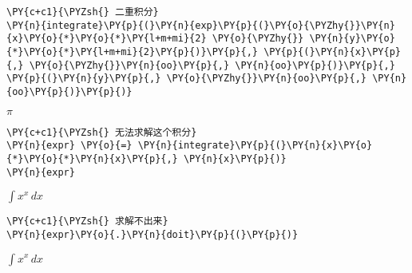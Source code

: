     \begin{tcolorbox}[breakable, size=fbox, boxrule=1pt, pad at break*=1mm,colback=cellbackground, colframe=cellborder]
\begin{Verbatim}[commandchars=\\\{\}]
\PY{c+c1}{\PYZsh{} 二重积分}
\PY{n}{integrate}\PY{p}{(}\PY{n}{exp}\PY{p}{(}\PY{o}{\PYZhy{}}\PY{n}{x}\PY{o}{*}\PY{o}{*}\PY{l+m+mi}{2} \PY{o}{\PYZhy{}} \PY{n}{y}\PY{o}{*}\PY{o}{*}\PY{l+m+mi}{2}\PY{p}{)}\PY{p}{,} \PY{p}{(}\PY{n}{x}\PY{p}{,} \PY{o}{\PYZhy{}}\PY{n}{oo}\PY{p}{,} \PY{n}{oo}\PY{p}{)}\PY{p}{,} \PY{p}{(}\PY{n}{y}\PY{p}{,} \PY{o}{\PYZhy{}}\PY{n}{oo}\PY{p}{,} \PY{n}{oo}\PY{p}{)}\PY{p}{)}
\end{Verbatim}
\end{tcolorbox}
 
            
    
    $\displaystyle \pi$

    

    \begin{tcolorbox}[breakable, size=fbox, boxrule=1pt, pad at break*=1mm,colback=cellbackground, colframe=cellborder]
\begin{Verbatim}[commandchars=\\\{\}]
\PY{c+c1}{\PYZsh{} 无法求解这个积分}
\PY{n}{expr} \PY{o}{=} \PY{n}{integrate}\PY{p}{(}\PY{n}{x}\PY{o}{*}\PY{o}{*}\PY{n}{x}\PY{p}{,} \PY{n}{x}\PY{p}{)}
\PY{n}{expr}
\end{Verbatim}
\end{tcolorbox}
 
            
    
    $\displaystyle \int x^{x}\, dx$

    

    \begin{tcolorbox}[breakable, size=fbox, boxrule=1pt, pad at break*=1mm,colback=cellbackground, colframe=cellborder]
\begin{Verbatim}[commandchars=\\\{\}]
\PY{c+c1}{\PYZsh{} 求解不出来}
\PY{n}{expr}\PY{o}{.}\PY{n}{doit}\PY{p}{(}\PY{p}{)}
\end{Verbatim}
\end{tcolorbox}
 
            
    
    $\displaystyle \int x^{x}\, dx$

